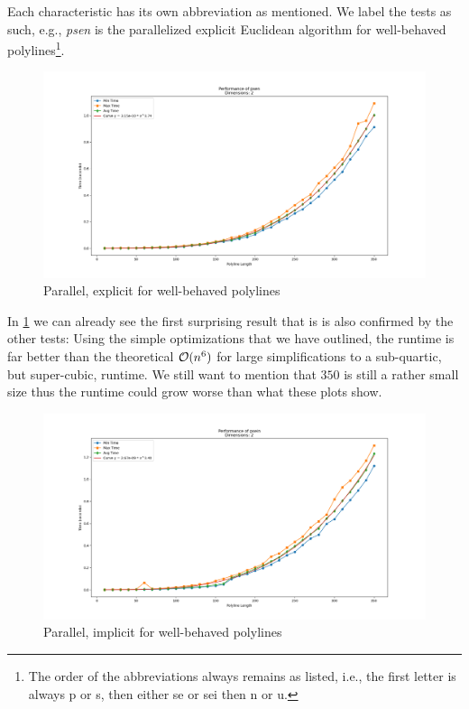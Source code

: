 Each characteristic has its own abbreviation as mentioned. We label the tests as such, e.g., \emph{psen} is the parallelized explicit Euclidean algorithm for well-behaved polylines\footnote{The order of the abbreviations always remains as listed, i.e., the first letter is always p or s, then either se or sei then n or u.}.

\begin{figure}[ht]
  \centering
  \includegraphics[scale=0.5, width=\linewidth]{figures/psen.png}
  \caption{Parallel, explicit for well-behaved polylines}
  \label{fig:psen}
\end{figure}

In \cref{fig:psen} we can already see the first surprising result that is is also confirmed by the other tests: Using the simple optimizations that we have outlined, the runtime is far better than the theoretical \(\mathcal{O}(n^6)\) for large simplifications to a sub-quartic, but super-cubic, runtime. We still want to mention that \(350\) is still a rather small size thus the runtime could grow worse than what these plots show. 

\begin{figure}[ht]
  \centering
  \includegraphics[scale=0.5, width=\linewidth]{figures/psein.png}
  \caption{Parallel, implicit for well-behaved polylines}
  \label{fig:psein}
\end{figure}

